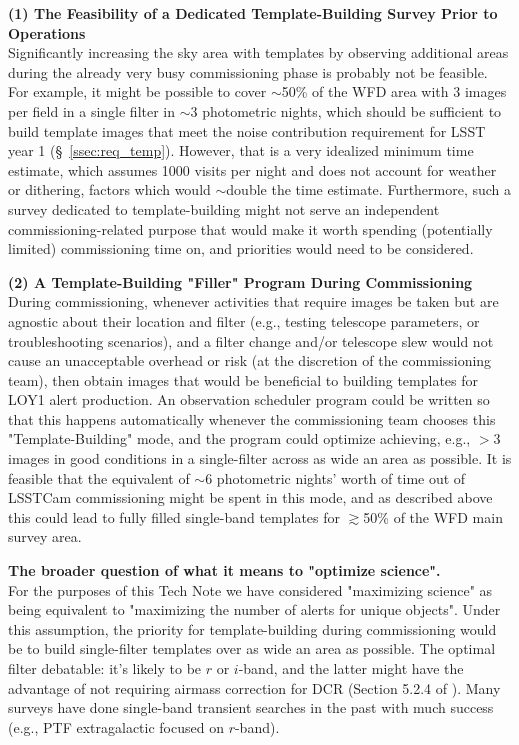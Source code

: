 \documentclass[DM,toc]{lsstdoc}
\begin{document}
{\bf (1) The Feasibility of a Dedicated Template-Building Survey Prior to Operations}\\
Significantly increasing the sky area with templates by observing additional areas during the already very busy commissioning phase is probably not be feasible.
For example, it might be possible to cover $\sim$50\% of the WFD area with $3$ images per field in a single filter in $\sim$3 photometric nights, which should be sufficient to build template images that meet the noise contribution requirement for LSST year 1 (\S~\ref{ssec:req_temp}).
However, that is a very idealized minimum time estimate, which assumes 1000 visits per night and does not account for weather or dithering, factors which would $\sim$double the time estimate.
Furthermore, such a survey dedicated to template-building might not serve an independent commissioning-related purpose that would make it worth spending (potentially limited) commissioning time on, and priorities would need to be considered.

{\bf (2) A Template-Building "Filler" Program During Commissioning}\\
During commissioning, whenever activities that require images be taken but are agnostic about their location and filter (e.g., testing telescope parameters, or troubleshooting scenarios), and a filter change and/or telescope slew would not cause an unacceptable overhead or risk (at the discretion of the commissioning team), then obtain images that would be beneficial to building templates for LOY1 alert production.
An observation scheduler program could be written so that this happens automatically whenever the commissioning team chooses this "Template-Building" mode, and the program could optimize achieving, e.g., $>$3 images in good conditions in a single-filter across as wide an area as possible.
It is feasible that the equivalent of $\sim$6 photometric nights' worth of time out of LSSTCam commissioning might be spent in this mode, and as described above this could lead to fully filled single-band templates for $\gtrsim$50\% of the WFD main survey area.

{\bf The broader question of what it means to "optimize science".} \\
For the purposes of this Tech Note we have considered "maximizing science" as being equivalent to "maximizing the number of alerts for unique objects".
Under this assumption, the priority for template-building during commissioning would be to build single-filter templates over as wide an area as possible.
The optimal filter debatable: it's likely to be $r$ or $i$-band, and the latter might have the advantage of not requiring airmass correction for DCR (Section 5.2.4 of ).
Many surveys have done single-band transient searches in the past with much success (e.g., PTF extragalactic focused on $r$-band).
\end{document}
